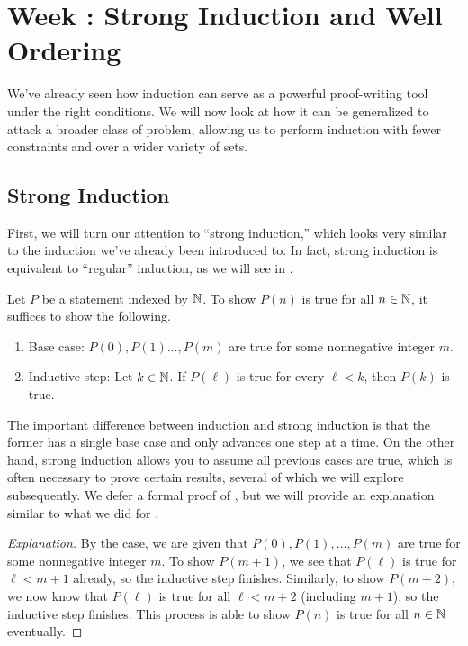 \documentclass[../notes.tex]{subfiles}
\begin{document}
\section{Week \theweek: Strong Induction and Well Ordering}
We've already seen how induction can serve as a powerful proof-writing tool under the right conditions. We will now look at how it can be generalized to attack a broader class of problem, allowing us to perform induction with fewer constraints and over a wider variety of sets.

\subsection{Strong Induction}
First, we will turn our attention to ``strong induction,'' which looks very similar to the induction we've already been introduced to. In fact, strong induction is equivalent to ``regular'' induction, as we will see in .
\begin{theorem}
    Let $P$ be a statement indexed by $\mathbb N$. To show $P(n)$ is true for all $n \in \mathbb N$, it suffices to show the following.
    \begin{enumerate}
        \item Base case: $P(0), P(1) \dots, P(m)$ are true for some nonnegative integer $m$.
        \item Inductive step: Let $k \in \mathbb N$. If $P(\ell)$ is true for every $\ell < k$, then $P(k)$ is true.
    \end{enumerate}
\end{theorem}
The important difference between induction and strong induction is that the former has a single base case and only advances one step at a time. On the other hand, strong induction allows you to assume all previous cases are true, which is often necessary to prove certain results, several of which we will explore subsequently. We defer a formal proof of , but we will provide an explanation similar to what we did for .
\begin{proof}[Explanation]
    By the case, we are given that $P(0),P(1),\ldots,P(m)$ are true for some nonnegative integer $m$. To show $P(m+1)$, we see that $P(\ell)$ is true for $\ell<m+1$ already, so the inductive step finishes. Similarly, to show $P(m+2)$, we now know that $P(\ell)$ is true for all $\ell<m+2$ (including $m+1$), so the inductive step finishes. This process is able to show $P(n)$ is true for all $n\in\mathbb N$ eventually.
\end{proof}
\end{document}
